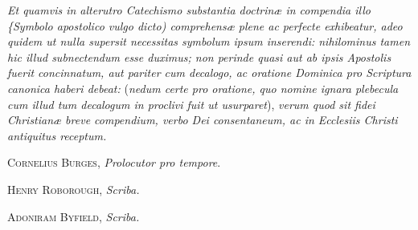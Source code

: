 \emph{Et quamvis in alterutro Catechismo substantia doctrinæ in compendia illo \{Symbolo apostolico vulgo dicto) comprehensæ plene ac perfecte exhibeatur, adeo quidem ut nulla supersit necessitas symbolum ipsum inserendi: nihilominus tamen hic illud subnectendum esse duximus; non perinde quasi aut ab ipsis Apostolis fuerit concinnatum, aut pariter cum decalogo, ac oratione Dominica pro Scriptura canonica haberi debeat:} (\emph{nedum certe pro oratione, quo nomine ignara plebecula cum illud tum decalogum in proclivi fuit ut usurparet}), \emph{verum quod sit fidei Christianæ breve compendium, verbo Dei consentaneum, ac in Ecclesiis Christi antiquitus receptum.}

C\textsc{ornelius} B\textsc{urges}, \emph{Prolocutor pro tempore}.

H\textsc{enry} R\textsc{oborough}, \emph{Scriba.}

A\textsc{doniram} B\textsc{yfield}, \emph{Scriba.}
